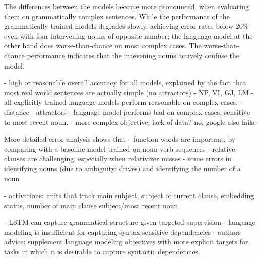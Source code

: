 The differences between the models become more pronounced,
when evaluating them on grammatically complex sentences.
While the performance of the grammatically trained models
degrades slowly, achieving error rates below 20\% even with
four intervening nouns of opposite number;
the language model at the other hand does worse-than-chance
on most complex cases. The worse-than-chance performance
indicates that the intevening nouns actively confuse
the model. 


- high or reasonable overall accuracy for all models, explained by the fact that most real world sentences are actually simple (no attractors)
   - NP, VI, GJ, LM
- all explicitly trained language models perform reasonable on complex cases.
   - distance
   - attractors
- language model performs bad on complex cases. sensitive to most recent noun.
  - more complex objective, lack of data? no, google also fails.

More detailed error analysis shows that
- function words are important, by comparing with a baseline model trained on noun verb sequences
- relative clauses are challenging, especially when relativizer misses
- some errors in identifying nouns (due to ambiguity: drives) and identifying the number of a noun

- activations: units that track main subject, subject of current clause, embedding status, number of main clause subject/most recent noun

- LSTM can capture grammatical structure given targeted supervision
- language modeling is insufficient for capturing syntax sensitive dependencies
- authors advice: supplement language modeling objectives with more explicit targets
for tasks in which it is desirable to capture syntactic dependencies.